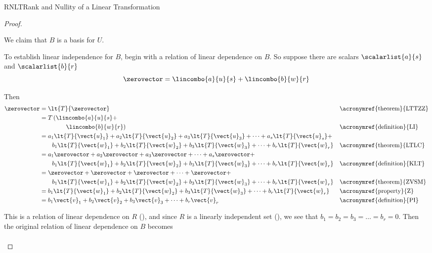 \begin{subsect}{RNLT}{Rank and Nullity of a Linear Transformation}
\begin{proof}
\begin{para}
%
We claim that $B$ is a basis for $U$.\end{para}
%
\begin{para}To establish linear independence for $B$, begin with a relation of linear dependence on $B$.  So suppose there are scalars $\scalarlist{a}{s}$ and $\scalarlist{b}{r}$
%
\begin{equation*}
\zerovector=\lincombo{a}{u}{s}+\lincombo{b}{w}{r}
\end{equation*}
\end{para}
%
\begin{para}Then
%
\begin{align*}
\zerovector&=\lt{T}{\zerovector}&&\text{\acronymref{theorem}{LTTZZ}}\\
%
&=T\left(\lincombo{a}{u}{s}+\right.\\
&\quad\quad\quad\quad\left.\lincombo{b}{w}{r}\right)&&\text{\acronymref{definition}{LI}}\\
%
&=a_1\lt{T}{\vect{u}_1}+a_2\lt{T}{\vect{u}_2}+a_3\lt{T}{\vect{u}_3}+\cdots+a_s\lt{T}{\vect{u}_s}+\\
&\quad\quad b_1\lt{T}{\vect{w}_1}+b_2\lt{T}{\vect{w}_2}+b_3\lt{T}{\vect{w}_3}+\cdots+b_r\lt{T}{\vect{w}_r}
&&\text{\acronymref{theorem}{LTLC}}\\
%
&=a_1\zerovector+a_2\zerovector+a_3\zerovector+\cdots+a_s\zerovector+\\
&\quad\quad b_1\lt{T}{\vect{w}_1}+b_2\lt{T}{\vect{w}_2}+b_3\lt{T}{\vect{w}_3}+\cdots+b_r\lt{T}{\vect{w}_r}
&&\text{\acronymref{definition}{KLT}}\\
%
&=\zerovector+\zerovector+\zerovector+\cdots+\zerovector+\\
&\quad\quad b_1\lt{T}{\vect{w}_1}+b_2\lt{T}{\vect{w}_2}+b_3\lt{T}{\vect{w}_3}+\cdots+b_r\lt{T}{\vect{w}_r}
&&\text{\acronymref{theorem}{ZVSM}}\\
%
&=b_1\lt{T}{\vect{w}_1}+b_2\lt{T}{\vect{w}_2}+b_3\lt{T}{\vect{w}_3}+\cdots+b_r\lt{T}{\vect{w}_r}&&\text{\acronymref{property}{Z}}\\
%
&=b_1\vect{v}_1+b_2\vect{v}_2+b_3\vect{v}_3+\cdots+b_r\vect{v}_r&&\text{\acronymref{definition}{PI}}
\end{align*}
\end{para}
%
\begin{para}This is a relation of linear dependence on $R$ (), and since $R$ is a linearly independent set (), we see that $b_1=b_2=b_3=\ldots=b_r=0$.  Then the original relation of linear dependence on $B$ becomes
%
\begin{align*}

\end{align*}
\end{para}
\end{proof}
\end{subsect}
